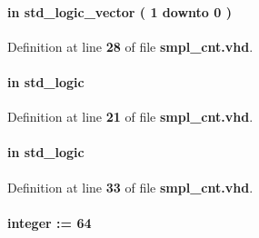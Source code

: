 \paragraph[{ch\+\_\+en}]{ {\bfseries \textcolor{keywordflow}{in}\textcolor{vhdlchar}{ }} {\bfseries \textcolor{comment}{std\+\_\+logic\+\_\+vector}\textcolor{vhdlchar}{ }\textcolor{vhdlchar}{(}\textcolor{vhdlchar}{ }\textcolor{vhdlchar}{ } \textcolor{vhdldigit}{1} \textcolor{vhdlchar}{ }\textcolor{keywordflow}{downto}\textcolor{vhdlchar}{ }\textcolor{vhdlchar}{ } \textcolor{vhdldigit}{0} \textcolor{vhdlchar}{ }\textcolor{vhdlchar}{)}\textcolor{vhdlchar}{ }} \hspace{0.3cm}{\ttfamily [Port]}}\label{classsmpl__cnt_a6494f316f504075c4ccf47146756d576}


Definition at line {\bf 28} of file {\bf smpl\+\_\+cnt.\+vhd}.

\paragraph[{clk}]{ {\bfseries \textcolor{keywordflow}{in}\textcolor{vhdlchar}{ }} {\bfseries \textcolor{comment}{std\+\_\+logic}\textcolor{vhdlchar}{ }} \hspace{0.3cm}{\ttfamily [Port]}}\label{classsmpl__cnt_a4a4609c199d30b3adebbeb3a01276ec5}


Definition at line {\bf 21} of file {\bf smpl\+\_\+cnt.\+vhd}.

\paragraph[{cnt\+\_\+en}]{ {\bfseries \textcolor{keywordflow}{in}\textcolor{vhdlchar}{ }} {\bfseries \textcolor{comment}{std\+\_\+logic}\textcolor{vhdlchar}{ }} \hspace{0.3cm}{\ttfamily [Port]}}\label{classsmpl__cnt_ae38744f3a642f6ace049aa96c2398489}


Definition at line {\bf 33} of file {\bf smpl\+\_\+cnt.\+vhd}.

\paragraph[{cnt\+\_\+width}]{ {\bfseries \textcolor{vhdlchar}{ }} {\bfseries \textcolor{comment}{integer}\textcolor{vhdlchar}{ }\textcolor{vhdlchar}{ }\textcolor{vhdlchar}{\+:}\textcolor{vhdlchar}{=}\textcolor{vhdlchar}{ }\textcolor{vhdlchar}{ } \textcolor{vhdldigit}{64} \textcolor{vhdlchar}{ }} \hspace{0.3cm}{\ttfamily [Generic]}}\label{classsmpl__cnt_a4328269cc798a8d2125c42471e783690}


